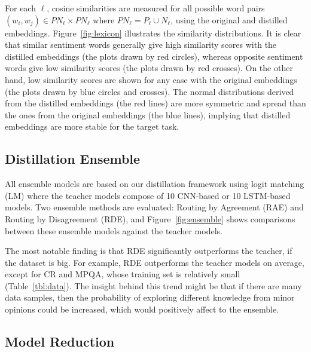 \documentclass{article}
\begin{document}
\noindent For each $\ell$, cosine similarities are measured for all possible word pairs $(w_i, w_j) \in PN_\ell \times PN_\ell$ where $PN_\ell = P_{\ell} \cup N_{\ell}$, using the original and distilled embeddings.
Figure~\ref{fig:lexicon} illustrates the similarity distributions.
It is clear that similar sentiment words generally give high similarity scores with the distilled embeddings (the plots drawn by red circles), whereas opposite sentiment words give low similarity scores (the plots drawn by red crosses).
On the other hand, low similarity scores are shown for any case with the original embeddings (the plots drawn by blue circles and crosses).
The normal distributions derived from the distilled embeddings (the red lines) are more symmetric and spread than the ones from the original embeddings (the blue lines), implying that distilled embeddings are more stable for the target task.





\subsection{Distillation Ensemble}
\label{sssec:distillensemble}



All ensemble models are based on our distillation framework using logit matching (LM) where the teacher models compose of 10 CNN-based or 10 LSTM-based models.
Two ensemble methods are evaluated: Routing by Agreement (RAE) and Routing by Disagreement (RDE), and
Figure~\ref{fig:ensemble} shows comparisons between these ensemble models against the teacher models.

The most notable finding is that RDE significantly outperforms the teacher, if the dataset is big.
For example, RDE outperforms the teacher models on average, except for CR and MPQA, whose training set is relatively small (Table~\ref{tbl:data}).
The insight behind this trend might be that if there are many data samples, then the probability of exploring different knowledge from minor opinions could be increased, which would positively affect to the ensemble.








\subsection{Model Reduction}
\label{sssec:modelsize}
\end{document}
